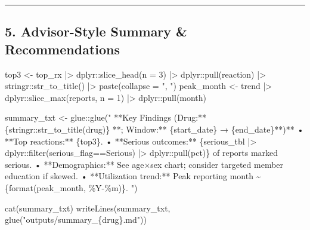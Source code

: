 \documentclass[
  letterpaper,
  DIV=11,
  numbers=noendperiod]{scrartcl}
\newenvironment{Shaded}{\begin{snugshade}}{\end{snugshade}}
\newcommand{\AttributeTok}[1]{\textcolor[rgb]{0.40,0.45,0.13}{#1}}
\newcommand{\DecValTok}[1]{\textcolor[rgb]{0.68,0.00,0.00}{#1}}
\newcommand{\FunctionTok}[1]{\textcolor[rgb]{0.28,0.35,0.67}{#1}}
\newcommand{\NormalTok}[1]{\textcolor[rgb]{0.00,0.23,0.31}{#1}}
\newcommand{\OtherTok}[1]{\textcolor[rgb]{0.00,0.23,0.31}{#1}}
\newcommand{\SpecialCharTok}[1]{\textcolor[rgb]{0.37,0.37,0.37}{#1}}
\newcommand{\StringTok}[1]{\textcolor[rgb]{0.13,0.47,0.30}{#1}}
\begin{document}
\begin{center}\rule{0.5\linewidth}{0.5pt}\end{center}

\subsection{5. Advisor-Style Summary \&
Recommendations}\label{advisor-style-summary-recommendations}

\begin{Shaded}
\begin{Highlighting}[]
\NormalTok{top3 }\OtherTok{\textless{}{-}}\NormalTok{ top\_rx }\SpecialCharTok{|\textgreater{}}\NormalTok{ dplyr}\SpecialCharTok{::}\FunctionTok{slice\_head}\NormalTok{(}\AttributeTok{n =} \DecValTok{3}\NormalTok{) }\SpecialCharTok{|\textgreater{}}\NormalTok{ dplyr}\SpecialCharTok{::}\FunctionTok{pull}\NormalTok{(reaction) }\SpecialCharTok{|\textgreater{}}\NormalTok{ stringr}\SpecialCharTok{::}\FunctionTok{str\_to\_title}\NormalTok{() }\SpecialCharTok{|\textgreater{}} \FunctionTok{paste}\NormalTok{(}\AttributeTok{collapse =} \StringTok{", "}\NormalTok{)}
\NormalTok{peak\_month }\OtherTok{\textless{}{-}}\NormalTok{ trend }\SpecialCharTok{|\textgreater{}}\NormalTok{ dplyr}\SpecialCharTok{::}\FunctionTok{slice\_max}\NormalTok{(reports, }\AttributeTok{n =} \DecValTok{1}\NormalTok{) }\SpecialCharTok{|\textgreater{}}\NormalTok{ dplyr}\SpecialCharTok{::}\FunctionTok{pull}\NormalTok{(month)}

\NormalTok{summary\_txt }\OtherTok{\textless{}{-}}\NormalTok{ glue}\SpecialCharTok{::}\FunctionTok{glue}\NormalTok{(}\StringTok{"}
\StringTok{**Key Findings (Drug:** \{stringr::str\_to\_title(drug)\} **; Window:** \{start\_date\} → \{end\_date\}**)**  }
\StringTok{• **Top reactions:** \{top3\}.  }
\StringTok{• **Serious outcomes:** \{serious\_tbl |\textgreater{} dplyr::filter(serious\_flag==\textquotesingle{}Serious\textquotesingle{}) |\textgreater{} dplyr::pull(pct)\} of reports marked serious.  }
\StringTok{• **Demographics:** See age×sex chart; consider targeted member education if skewed.  }
\StringTok{• **Utilization trend:** Peak reporting month \textasciitilde{} \{format(peak\_month, \textquotesingle{}\%Y{-}\%m\textquotesingle{})\}.}
\StringTok{"}\NormalTok{)}

\FunctionTok{cat}\NormalTok{(summary\_txt)}
\FunctionTok{writeLines}\NormalTok{(summary\_txt, }\FunctionTok{glue}\NormalTok{(}\StringTok{"outputs/summary\_\{drug\}.md"}\NormalTok{))}
\end{Highlighting}
\end{Shaded}
\end{document}
